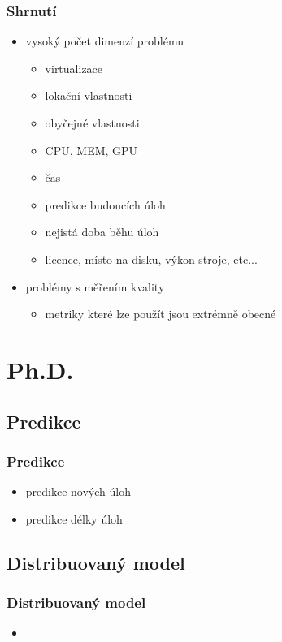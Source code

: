 \documentclass[pdftex,fleqn,aspectratio=169]{beamer}
\begin{document}
\begin{frame}
	\frametitle{Shrnutí}
	\begin{itemize}
		\item vysoký počet dimenzí problému
		\begin{itemize}
			\item virtualizace
			\item lokační vlastnosti
			\item obyčejné vlastnosti
			\item CPU, MEM, GPU
			\item čas
			\item predikce budoucích úloh
			\item nejistá doba běhu úloh
			\item licence, místo na disku, výkon stroje, etc...
		\end{itemize}
		\item problémy s měřením kvality
		\begin{itemize}
			\item metriky které lze použít jsou extrémně obecné
		\end{itemize}
	\end{itemize}
\end{frame}

\section{Ph.D.}
\subsection{Predikce}

\begin{frame}
	\frametitle{Predikce}
	\begin{itemize}
	 \item predikce nových úloh
	 \item predikce délky úloh
	\end{itemize}
\end{frame}

\subsection{Distribuovaný model}

\begin{frame}
	\frametitle{Distribuovaný model}
	\begin{itemize}
	 \item 
	\end{itemize}

\end{frame}
\end{document}
